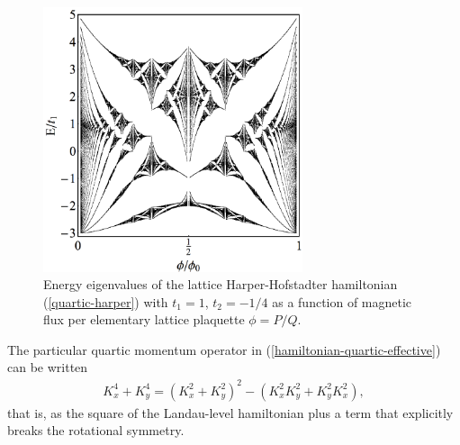 \documentclass[aps,prb,twocolumn,letterpaper,twoside,nobalancelastpage,groupedaddress,amsmath,amssymb,floatfix,citeautoscript]{revtex4-1}
\begin{document}
\begin{figure}[thb]
\centering
\hspace{-0.25in}\includegraphics[width=3.0in]{q-butterfly-raster-1200.pdf}
\caption{\label{butterfly-plot} Energy eigenvalues of the lattice Harper-Hofstadter hamiltonian (\ref{quartic-harper}) with $t_1 = 1$, $t_2 = -1/4$ as a function of magnetic flux per elementary lattice plaquette $\phi = P/Q$.}
\end{figure}


The particular quartic momentum operator in (\ref{hamiltonian-quartic-effective}) can be written
\begin{align*}
K_x^4 + K_y^4 = \left(K_x^2 + K_y^2\right)^2 - \left(K_x^2K_y^2 + K_y^2K_x^2\right),
\end{align*}
that is, as the square of the Landau-level hamiltonian plus a term that explicitly breaks the rotational symmetry.
\end{document}
